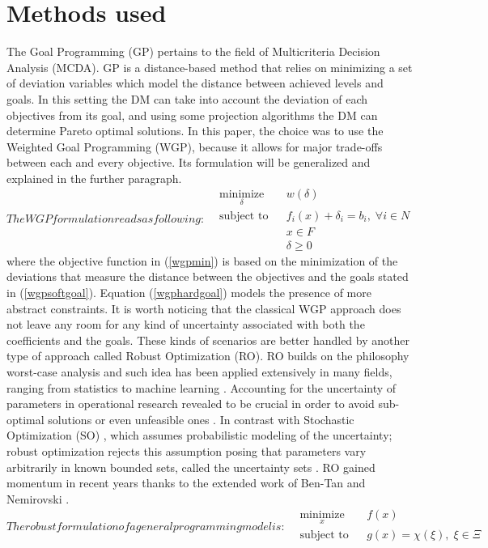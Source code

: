 \documentclass[conference,final,a4paper]{IEEEtran}
\begin{document}
\hypertarget{methods-used}{%
\section{Methods used}\label{methods-used}}
The Goal Programming (GP) \cite{charnes55} pertains to the field of Multicriteria Decision Analysis (MCDA). GP is a distance-based method that relies on minimizing a set of deviation variables which model the distance between achieved levels and goals. In this setting the DM can take into account the deviation of each objectives from its goal, and using some projection algorithms the DM can determine Pareto optimal solutions. In this paper, the choice was to use the Weighted Goal Programming (WGP), because it allows for major trade-offs between each and every objective. Its formulation will be generalized and explained in the further paragraph.
\begin{subequations}
The WGP formulation reads as following:
\begin{align}
    & \underset{\delta}{\text{minimize}} & & w(\delta) \label{wgpmin} \\
    & \text{subject to} & & f_i(x)+ \delta_i=b_i, \; \forall i \in N \label{wgpsoftgoal} \\
    & & & x\in F \label{wgphardgoal}\\
    & & & \delta\geq 0 \label{wgppositivity}
\end{align}
\end{subequations}
where the objective function in (\ref{wgpmin}) is based on the minimization of the deviations that measure the distance between the objectives and the goals stated in (\ref{wgpsoftgoal}). Equation (\ref{wgphardgoal}) models the presence of more abstract constraints. It is worth noticing that the classical WGP approach does not leave any room for any kind of uncertainty associated with both the coefficients and the goals. These kinds of scenarios are better handled by another type of approach called Robust Optimization (RO). RO builds on the philosophy worst-case analysis and such idea has been applied extensively in many fields, ranging from statistics \cite{huber64} to machine learning \cite{vapnik63}\cite{tibshirani96}. Accounting for the uncertainty of parameters in operational research revealed to be crucial in order to avoid sub-optimal solutions or even unfeasible ones \cite{ben-tal00}. In contrast with Stochastic Optimization (SO) \cite{dantzig55}, which assumes probabilistic modeling of the uncertainty; robust optimization rejects this assumption posing that parameters vary arbitrarily in known bounded sets, called the uncertainty sets \cite{soyster73}. RO gained momentum in recent years thanks to the extended work of Ben-Tan and Nemirovski \cite{ben-tal97}\cite{ben-tal98}\cite{ben-tal99}.
\begin{subequations}
The robust formulation of a general programming model is:
\begin{align}
    & \underset{x}{\text{minimize}} & & f(x) \label{rpmin} \\
    & \text{subject to} & & g(x)=\chi(\xi), \; \xi \in \Xi \label{rpcon} \\
\end{align}
\end{subequations}
\end{document}
